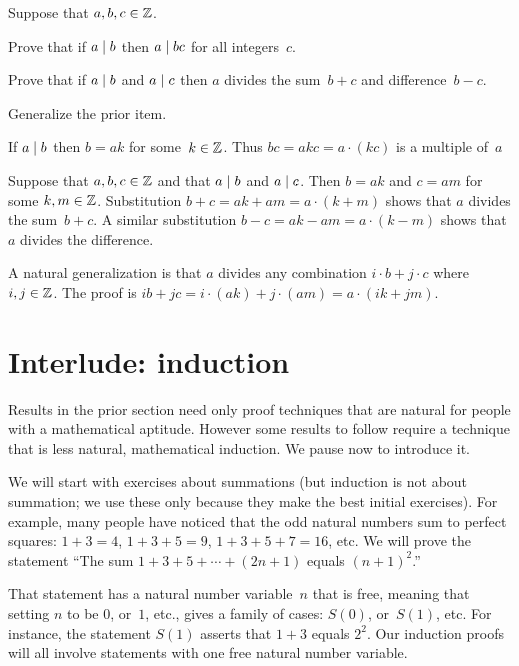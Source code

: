 \documentclass{ibl}  %
\begin{document}
\begin{ex} \label{ex:DividesAndLinearCombinations}
Suppose that $a,b,c\in\mathbb{Z}$.
\begin{exes}
\item Prove that if $a\mid b$ then $a\mid bc$ for all integers~$c$.
\item Prove that if $a\mid b$ and $a\mid c$ then $a$ divides the 
  sum~$b+c$ and difference~$b-c$.
\item  {} Generalize the prior item.
\end{exes}
\begin{ans}
\begin{exes}
\item If $a\mid b$ then $b=ak$ for some~$k\in\mathbb{Z}$.
  Thus $bc=akc=a\cdot(kc)$ is a multiple of~$a$
\item Suppose that $a,b,c\in\mathbb{Z}$ and that $a\mid b$ and $a\mid c$.
  Then $b=ak$ and $c=am$ for some $k,m\in\mathbb{Z}$. 
  Substitution  
  $b+c=ak+am=a\cdot(k+m)$
  shows that $a$ divides the sum~$b+c$.
  A similar substitution
  $b-c=ak-am=a\cdot(k-m)$
  shows that $a$ divides the difference.
\item A natural generalization is that $a$ divides any combination
  $i\cdot b+j\cdot c$ where $i,j\in\mathbb{Z}$.
  The proof is
  $ib+jc=i\cdot (ak)+j\cdot(am)=a\cdot(ik+jm)$.
\end{exes}
\end{ans}
\end{ex}




\section{Interlude: induction}
Results in the prior section need only proof techniques that are natural
for people with a mathematical aptitude.
However some results to follow require a technique 
that is less natural, mathematical induction.
We pause now to introduce it.

We will start with exercises about summations 
(but induction is not about summation;
we use these only because they make the best initial exercises).
For example, many people have noticed that the odd natural numbers sum to 
perfect squares: $1+3=4$, $1+3+5=9$, $1+3+5+7=16$, etc.
We will prove the statement
``The sum $1+3+5+\cdots+(2n+1)$ equals $(n+1)^2$.'' 

That statement has a natural number variable~$n$ that is free, 
meaning that setting $n$ to be $0$, or~$1$, etc., gives 
a family of cases: $S(0)$, or~$S(1)$, 
etc.  
For instance, the statement $S(1)$ asserts that $1+3$ equals $2^2$.
Our induction proofs will all involve statements with one free 
natural number variable.
\end{document}
